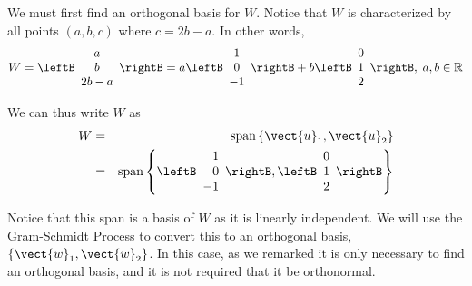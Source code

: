 \begin{solution}
We must first find an orthogonal basis for $W$. Notice that $W$ is
characterized by all points $(a,b,c)$ where $c = 2b-a$. In other
words,
\[
W = 
\leftB
\begin{array}{c}
a \\
b \\
2b - a 
\end{array}
\rightB
= 
a \leftB
\begin{array}{c}
1 \\
0 \\
-1 
\end{array}
\rightB
+ 
b \leftB
\begin{array}{c}
0 \\
1 \\
2 
\end{array}
\rightB, 
\; 
a,b \in \mathbb{R}
\] 

We can thus write $W$ as 
\begin{eqnarray*}
W &=& \mbox{span} \left\{ \vect{u}_1, \vect{u}_2 \right\} \\
 &=& \mbox{span} 
\left\{
\leftB
\begin{array}{r}
1 \\
0 \\
-1
\end{array}
\rightB,
\leftB
\begin{array}{c}
0 \\
1 \\
2
\end{array}
\rightB
\right\}
\end{eqnarray*}

Notice that this span is a basis of $W$ as it is linearly
independent. We will use the Gram-Schmidt Process to convert this to
an orthogonal basis, $\left\{\vect{w}_1, \vect{w}_2 \right\}$. In this
case, as we remarked it is only necessary to find an orthogonal basis, and it is not
required that it be orthonormal.


\end{solution}
